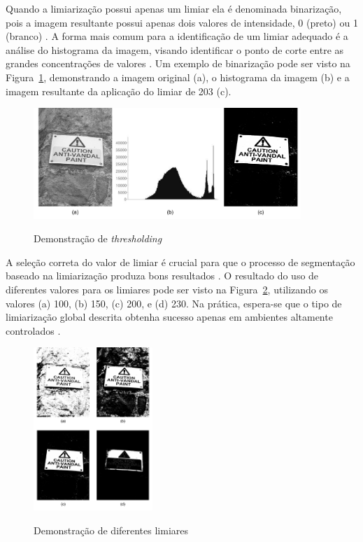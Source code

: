 \documentclass[12pt,oneside,a4paper,english,french,spanish,brazil,]{abntex2}
\begin{document}
Quando a limiarização possui apenas um limiar ela é denominada binarização, pois a imagem resultante possui apenas dois valores de intensidade, 0 (preto) ou 1 (branco) \cite{pedrini:2008}. A forma mais comum para a identificação de um limiar adequado é a análise do histograma da imagem, visando identificar o ponto de corte entre as grandes concentrações de valores \cite{gonzalez:2012}. Um exemplo de binarização pode ser visto na Figura~\ref{fig:PDI_Limiarizacao}, demonstrando a imagem original (a), o histograma da imagem (b) e a imagem resultante da aplicação do limiar de  203 (c).

\begin{figure}[ht]
\centering
\caption{ Demonstração de \textit{thresholding}}
\includegraphics[width=0.9\textwidth]{imagens/PDI_Limiarizacao.pdf}
\sourceAuthor
\label{fig:PDI_Limiarizacao}
\end{figure}

A seleção correta do valor de limiar é crucial para que o processo de segmentação baseado na limiarização produza bons resultados \cite{pedrini:2008}. O resultado do uso de diferentes valores para os limiares pode ser visto na Figura~\ref{fig:PDI_Limiarizacao_2}, utilizando os valores (a) 100, (b) 150, (c) 200, e (d) 230. Na prática, espera-se que o tipo de limiarização global descrita obtenha sucesso apenas em ambientes altamente controlados \cite{gonzalez:2012}.

\begin{figure}[ht]
\centering
\caption{Demonstração de diferentes limiares}
\includegraphics[width=0.4\textwidth]{imagens/PDI_Limiarizacao_2.pdf}
\sourceAuthor
\label{fig:PDI_Limiarizacao_2}
\end{figure}
\end{document}
